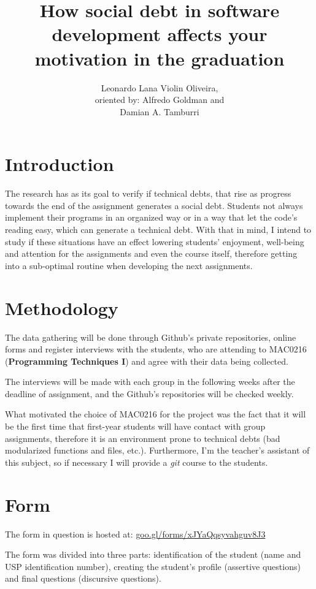 \documentclass[a4paper, 12pt]{article}
\title{How social debt in software development affects your motivation in the graduation}
\author{Leonardo Lana Violin Oliveira, \\ oriented by: Alfredo Goldman and \\ Damian A. Tamburri }
\begin{document}
\maketitle

\section*{Introduction}
The research has as its goal to verify if technical debts, that rise as progress towards the end of
the assignment generates a social debt. Students not always implement their programs
in an organized way or in a way that let the code's reading easy, which can generate a
technical debt. With that in mind, I intend to study if these situations have an effect
lowering students' enjoyment, well-being and  attention for the assignments and even the
course itself, therefore getting into a sub-optimal routine when developing the
next assignments.

\section*{Methodology}
The data gathering will be done through Github's private repositories, online forms
and register interviews with the students, who are attending to MAC0216
(\textbf{Programming Techniques I}) and agree with their data being collected.

The interviews will be made with each group in the following weeks after the deadline of
assignment, and the Github's repositories will be checked weekly.

What motivated the choice of MAC0216 for the project was the fact that it will be the first
time that first-year students will have contact with group assignments, therefore it is 
an environment prone to technical debts (bad modularized functions and files, etc.).
Furthermore, I'm the teacher's assistant of this subject, so if necessary I will provide
a \textit{git} course to the students.

\section*{Form}
The form in question is hosted at: \url{goo.gl/forms/xJYaQqsyvahguv8J3}

The form was divided into three parts: identification of the student (name and
USP identification number), creating the student's profile (assertive questions)
and final questions (discursive questions).
\end{document}
